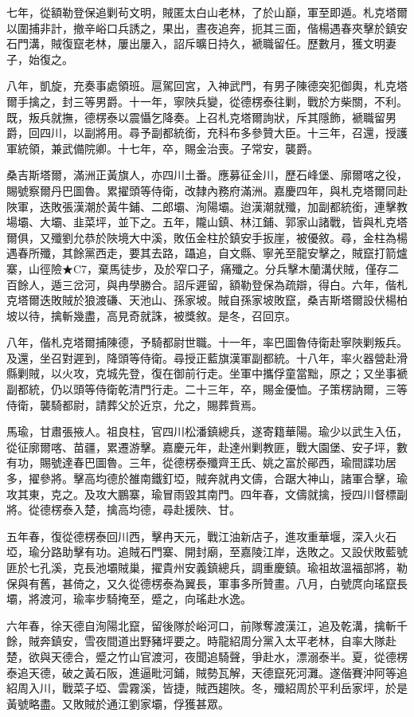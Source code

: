 \begin{pinyinscope}
七年，從額勒登保追剿茍文明，賊匿太白山老林，了於山巔，軍至即遁。札克塔爾以圍捕非計，撤辛峪口兵誘之，果出，晝夜追奔，扼其三面，偕楊遇春夾擊於鎮安石門溝，賊復竄老林，屢出屢入，詔斥曠日持久，褫職留任。歷數月，獲文明妻子，始復之。

八年，凱旋，充奏事處領班。扈駕回宮，入神武門，有男子陳德突犯御輿，札克塔爾手擒之，封三等男爵。十一年，寧陜兵變，從德楞泰往剿，戰於方柴關，不利。既，叛兵就撫，德楞泰以震懾乞降奏。上召札克塔爾詢狀，斥其隱飾，褫職留男爵，回四川，以副將用。尋予副都統銜，充科布多參贊大臣。十三年，召還，授護軍統領，兼武備院卿。十七年，卒，賜金治喪。子常安，襲爵。

桑吉斯塔爾，滿洲正黃旗人，亦四川土番。應募征金川，歷石峰堡、廓爾喀之役，賜號察爾丹巴圖魯。累擢頭等侍衛，改隸內務府滿洲。嘉慶四年，與札克塔爾同赴陜軍，迭敗張漢潮於黃牛鋪、二郎壩、洵陽壩。迨漢潮就殲，加副都統銜，連擊教場壩、大壩、韭菜坪，並下之。五年，隴山鎮、林江鋪、郭家山諸戰，皆與札克塔爾俱，又殲劉允恭於陜境大中溪，敗伍金柱於鎮安手扳崖，被優敘。尋，金柱為楊遇春所殲，其餘黨西走，要其去路，躡追，自文縣、寧羌至龍安擊之，賊竄打箭爐寨，山徑險★C7，棄馬徒步，及於窄口子，痛殲之。分兵擊木蘭溝伏賊，僅存二百餘人，遁三岔河，與冉學勝合。詔斥遲留，額勒登保為疏辯，得白。六年，偕札克塔爾迭敗賊於狼渡磏、天池山、孫家坡。賊自孫家坡敗竄，桑吉斯塔爾設伏楊柏坡以待，擒斬幾盡，高見奇就誅，被獎敘。是冬，召回京。

八年，偕札克塔爾捕陳德，予騎都尉世職。十一年，率巴圖魯侍衛赴寧陜剿叛兵。及還，坐召對遲到，降頭等侍衛。尋授正藍旗漢軍副都統。十八年，率火器營赴滑縣剿賊，以火攻，克城先登，復在御前行走。坐軍中攜俘童當黜，原之；又坐事褫副都統，仍以頭等侍衛乾清門行走。二十三年，卒，賜金優恤。子策楞訥爾，三等侍衛，襲騎都尉，請葬父於近京，允之，賜葬貲焉。

馬瑜，甘肅張掖人。祖良柱，官四川松潘鎮總兵，遂寄籍華陽。瑜少以武生入伍，從征廓爾喀、苗疆，累遷游擊。嘉慶元年，赴達州剿教匪，戰大園堡、安子坪，數有功，賜號達春巴圖魯。三年，從德楞泰殲齊王氏、姚之富於鄖西，瑜間諜功居多，擢參將。擊高均德於雒南鐵釘埡，賊奔就冉文儔，合踞大神山，諸軍合擊，瑜攻其東，克之。及攻大鵬寨，瑜冒雨毀其南門。四年春，文儔就擒，授四川督標副將。從德楞泰入楚，擒高均德，尋赴援陜、甘。

五年春，復從德楞泰回川西，擊冉天元，戰江油新店子，進攻重華堰，深入火石埡，瑜分路助擊有功。追賊石門寨、開封廟，至嘉陵江岸，迭敗之。又設伏敗藍號匪於七孔溪，克長池壩賊巢，擢貴州安義鎮總兵，調重慶鎮。瑜祖故溫福部將，勒保與有舊，甚倚之，又久從德楞泰為翼長，軍事多所贊畫。八月，白號庹向瑤竄長壩，將渡河，瑜率步騎掩至，蹙之，向瑤赴水逸。

六年春，徐天德自洵陽北竄，留後隊於峪河口，前隊奪渡漢江，追及乾溝，擒斬千餘，賊奔鎮安，雪夜間道出野豬坪要之。時龍紹周分黨入太平老林，自率大隊赴楚，欲與天德合，蹙之竹山官渡河，夜聞追騎聲，爭赴水，漂溺泰半。夏，從德楞泰追天德，破之黃石阪，進逼毗河鋪，賊勢瓦解，天德竄死河灘。遂偕賽沖阿等追紹周入川，戰菜子埡、雲霧溪，皆捷，賊西趨陜。冬，殲紹周於平利岳家坪，於是黃號略盡。又敗賊於通江劉家壩，俘獲甚眾。


\end{pinyinscope}
